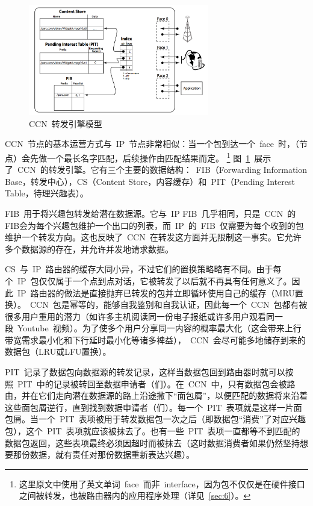\begin{figure}[htbp]
  \centering
  \includegraphics[width=0.7\textwidth]{images/engine}
  \caption{CCN~转发引擎模型} 
  \label{engine}
\end{figure}

CCN~节点的基本运营方式与~IP~节点非常相似：当一个包到达一个~face~时，（节点）会先做一个最长名字匹配，后续操作由匹配结果而定。
\renewcommand\baselinestretch{1} %
\footnote{这里原文中使用了英文单词~face~而非~interface，因为包不仅仅是在硬件接口之间被转发，也被路由器内的应用程序处理（详见~\ref{sec:6}）。}
图~\ref{engine}~展示了~CCN~的转发引擎。它有三个主要的数据结构：~FIB（Forwarding Information Base，转发中心），CS（Content Store，内容缓存）和~PIT（Pending Interest Table，待理兴趣表）。

FIB~用于将兴趣包转发给潜在数据源。它与~IP FIB~几乎相同，只是~CCN~的FIB会为每个兴趣包维护一个出口的列表，而~IP~的~FIB~仅需要为每个收到的包维护一个转发方向。这也反映了~CCN~在转发这方面并无限制这一事实。它允许多个数据源的存在，并允许并发地请求数据。

CS~与~IP~路由器的缓存大同小异，不过它们的置换策略略有不同。由于每个~IP~包仅仅属于一个点到点对话，它被转发了以后就不再具有任何意义了。因此~IP~路由器的做法是直接抛弃已转发的包并立即循环使用自己的缓存（MRU置换）。~CCN~包是幂等的，能够自我鉴别和自我认证，因此每一个~CCN~包都有被很多用户重用的潜力（如许多主机阅读同一份电子报纸或许多用户观看同一段~Youtube~视频）。为了使多个用户分享同一内容的概率最大化（这会带来上行带宽需求最小化和下行延时最小化等诸多裨益），~CCN~会尽可能多地储存到来的数据包（LRU或LFU置换）。

PIT~记录了数据包向数据源的转发记录，这样当数据包回到路由器时就可以按照~PIT~中的记录被转回至数据申请者（们）。在~CCN~中，只有数据包会被路由，并在它们走向潜在数据源的路上沿途撒下“面包屑”，以便匹配的数据将来沿着这些面包屑逆行，直到找到数据申请者（们）。每一个~PIT~表项就是这样一片面包屑。当一个~PIT~表项被用于转发数据包一次之后（即数据包“消费”了对应兴趣包），这个~PIT~表项就应该被抹去了。也有一些~PIT~表项一直都等不到匹配的数据包返回，这些表项最终必须因超时而被抹去（这时数据消费者如果仍然坚持想要那份数据，就有责任对那份数据重新表达兴趣）。

